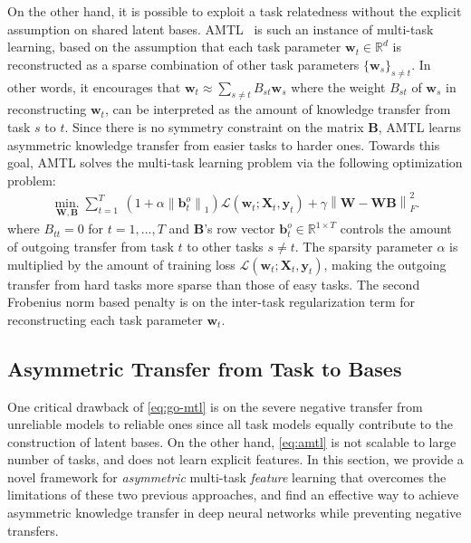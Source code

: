 \documentclass{article}
\newcommand{\vct}[1]{\boldsymbol{#1}} %
\newcommand{\mat}[1]{\boldsymbol{#1}} %
\newcommand{\norm}[1]{\left\|#1\right\|}
\begin{document}
	On the other hand, it is possible to exploit a task relatedness without the explicit assumption on shared latent bases. AMTL~\cite{amtl} is such an instance of multi-task learning, based on the assumption that each task parameter $\vct{w}_t \in \mathbb{R}^{d}$ is reconstructed as a sparse combination of other task parameters $\{\vct{w}_{s}\}_{s\neq t}$. In other words, it encourages that $\vct{w}_t \approx \sum_{s \neq t} B_{st}\vct{w}_{s}$ where the weight $B_{st}$ of $\vct{w}_s$ in reconstructing $\vct{w}_t$, can be interpreted as the amount of knowledge transfer from task $s$ to $t$. Since there is no symmetry constraint on the matrix $\mat{B}$, AMTL learns asymmetric knowledge transfer from easier tasks to harder ones. Towards this goal, AMTL solves the multi-task learning problem via the following optimization problem:
	\begin{equation}
	\begin{aligned}
	\operatorname*{min.}_{\mat{W},\mat{B}} \sum_{t=1}^T \ (1+\alpha\norm{\vct{b}_t^o}_1) \mathcal{L}(\vct{w}_t; \mat{X}_t, \vct{y}_t) + \gamma \norm{\mat{W}-\mat{W}\mat{B}}_F^2. \label{eq:amtl}
	\end{aligned}
	\end{equation}
	where $B_{tt} = 0$ for $t = 1,...,T$ and $\mat{B}$'s row vector $\vct{b}_t^o \in \mathbb{R}^{1 \times T}$ controls the amount of outgoing transfer from task $t$ to other tasks $s \neq t$. The sparsity parameter $\alpha$ is multiplied by the amount of training loss $\mathcal{L}(\vct{w}_t;\mat{X}_t,\vct{y}_t)$, making the outgoing transfer from hard tasks more sparse than those of easy tasks. The second Frobenius norm based penalty is on the inter-task regularization term for reconstructing each task parameter $\vct{w}_t$.
	
	\subsection{Asymmetric Transfer from Task to Bases}
	One critical drawback of \eqref{eq:go-mtl} is on the severe negative transfer from unreliable models to reliable ones since all task models {equally} contribute to the construction of latent bases. On the other hand, \eqref{eq:amtl} is not scalable to large number of tasks, and does not learn explicit features. In this section, we provide a novel framework for \emph{asymmetric} multi-task \emph{feature} learning that overcomes the limitations of these two previous approaches, and find an effective way to achieve asymmetric knowledge transfer in deep neural networks while preventing negative transfers.
	
\end{document}
